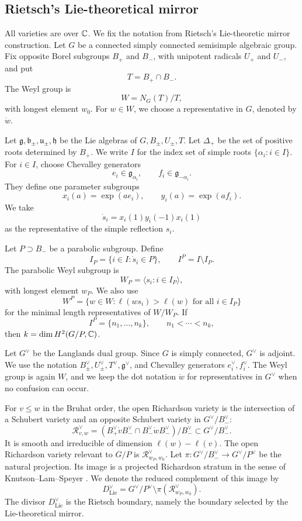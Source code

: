 \subsection{Rietsch's Lie-theoretical mirror}

All varieties are over \(\mathbb{C}\). We fix the notation from Rietsch's Lie-theoretic mirror construction. Let \(G\) be a connected simply connected semisimple algebraic group. Fix opposite Borel subgroups \(B_+\) and \(B_-\), with unipotent radicals \(U_+\) and \(U_-\), and put
\[
T=B_+\cap B_-.
\]
The Weyl group is
\[
W=N_G(T)/T,
\]
with longest element \(w_0\). For \(w\in W\), we choose a representative in \(G\), denoted by \(\dot w\).

Let \(\mathfrak g,\mathfrak b_\pm,\mathfrak u_\pm,\mathfrak h\) be the Lie algebras of \(G,B_\pm,U_\pm,T\). Let \(\Delta_+\) be the set of positive roots determined by \(B_+\). We write \(I\) for the index set of simple roots \(\{\alpha_i:i\in I\}\). For \(i\in I\), choose Chevalley generators
\[
e_i\in\mathfrak g_{\alpha_i},
\qquad
f_i\in\mathfrak g_{-\alpha_i}.
\]
They define one parameter subgroups
\[
x_i(a)=\exp(ae_i),
\qquad
y_i(a)=\exp(af_i).
\]
We take
\[
\dot s_i=x_i(1)y_i(-1)x_i(1)
\]
as the representative of the simple reflection \(s_i\).

Let \(P\supset B_-\) be a parabolic subgroup. Define
\[
I_P=\{i\in I:\dot s_i\in P\},
\qquad
I^P=I\setminus I_P.
\]
The parabolic Weyl subgroup is
\[
W_P=\langle s_i:i\in I_P\rangle,
\]
with longest element \(w_P\). We also use
\[
W^P=\{w\in W:\ell(ws_i)>\ell(w)\text{ for all }i\in I_P\}
\]
for the minimal length representatives of \(W/W_P\). If
\[
I^P=\{n_1,\ldots,n_k\},
\qquad
n_1<\cdots<n_k,
\]
then \(k=\dim H^2(G/P,\mathbb{C})\).

Let \(G^\vee\) be the Langlands dual group. Since \(G\) is simply connected, \(G^\vee\) is adjoint. We use the notation \(B_\pm^\vee,U_\pm^\vee,T^\vee,\mathfrak g^\vee\), and Chevalley generators \(e_i^\vee,f_i^\vee\). The Weyl group is again \(W\), and we keep the dot notation \(\dot w\) for representatives in \(G^\vee\) when no confusion can occur.

For \(v\leq w\) in the Bruhat order, the open Richardson variety is the intersection of a Schubert variety and an opposite Schubert variety in \(G^\vee/B_-^\vee\):
\[
\mathcal R_{v,w}^\vee
=
\left(B_+^\vee\dot vB_-^\vee\cap B_-^\vee\dot wB_-^\vee\right)/B_-^\vee
\subset G^\vee/B_-^\vee .
\]
It is smooth and irreducible of dimension \(\ell(w)-\ell(v)\). The open Richardson variety relevant to \(G/P\) is \(\mathcal R_{w_P,w_0}^\vee\). Let \(\pi:G^\vee/B_-^\vee\to G^\vee/P^\vee\) be the natural projection. Its image is a projected Richardson stratum in the sense of Knutson--Lam--Speyer \cite{KLS}. We denote the reduced complement of this image by
\[
D_{\mathrm{Lie}}^\vee=G^\vee/P^\vee\setminus \pi(\mathcal R_{w_P,w_0}^\vee).
\]
The divisor \(D_{\mathrm{Lie}}^\vee\) is the Rietsch boundary, namely the boundary selected by the Lie-theoretical mirror.


